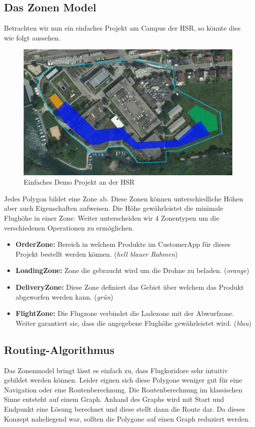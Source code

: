 \subsection{Das Zonen Model}
Betrachten wir nun ein einfaches Projekt am Campus der HSR, so könnte dies wie folgt aussehen. \\
\begin{figure}[h]
	\includegraphics[width=1.0\textwidth]{images/routing/simpleProject_example.png}
	\caption{Einfaches Demo Projekt an der HSR}
	\label{fig:demo-project}
\end{figure}
Jedes Polygon bildet eine Zone ab. Diese Zonen können unterschiedliche Höhen aber auch Eigenschaften aufweisen. Die Höhe gewährleistet die minimale Flughöhe in einer Zone. Weiter unterscheiden wir 4 Zonentypen um die verschiedenen Operationen zu ermöglichen.
\begin{itemize}
	\item{\textbf{OrderZone:} Bereich in welchem Produkte im CustomerApp für dieses Projekt bestellt werden können.  (\textit{hell blauer Rahmen})}
	\item{\textbf{LoadingZone:} Zone die gebraucht wird um die Drohne zu beladen. (\textit{orange})}
	\item{\textbf{DeliveryZone:} Diese Zone definiert das Gebiet über welchem das Produkt abgeworfen werden kann. (\textit{grün})}
	\item{\textbf{FlightZone:} Die Flugzone verbindet die Ladezone mit der Abwurfzone. Weiter garantiert sie, dass die angegebene Flughöhe gewährleistet wird. (\textit{blau})}
\end{itemize}
\subsection{Routing-Algorithmus}
Das Zonenmodel bringt lässt es einfach zu, dass Flugkoridore sehr intuitiv gebildet werden können. Leider eignen sich diese Polygone weniger gut für eine Navigation oder eine Routenberechnung. Die Routenberechnung im klassischen Sinne entsteht auf einem Graph. Anhand des Graphs wird mit Start und Endpunkt eine Lösung berechnet und diese stellt dann die Route dar. Da dieses Konzept naheliegend war, sollten die Polygone auf einen Graph reduziert werden.
